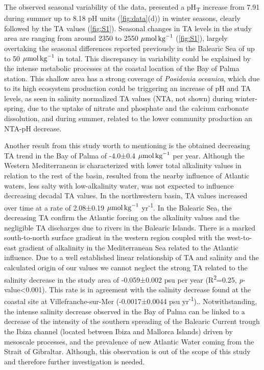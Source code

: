 The observed seasonal variability of the data, presented a
pH\textsubscript{T} increase from 7.91 during summer up to 8.18 pH units
(\cref{fig:data}(d)) in winter seasons, clearly followed by the TA values
(\cref{fig:S1}). Seasonal changes in TA levels in the study area are ranging
from around 2350 to 2550 ${\mu \textrm{mol\,kg}^{-1}}$ (\cref{fig:S1}), largely
overtaking the seasonal differences reported previously in the Balearic Sea of
up to 50 ${\mu \textrm{mol\,kg}^{-1}}$ in
total\cite{cossarini2015spatiotemporal}. This discrepancy in variability could
be explained by the intense metabolic processes at the coastal location of the
Bay of Palma station. This shallow area has a strong coverage of
\emph{Posidonia oceanica}, which due to its high ecosystem
production\cite{koopmans2020high} could be triggering an increase of pH and TA
levels, as seen in salinity normalized TA values (NTA, not shown) during
winter-spring, due to the uptake of nitrate and phosphate and the calcium
carbonate dissolution\cite{barron2006organic,cossarini2015spatiotemporal}, and
during summer, related to the lower community
production\cite{champenois2012seasonal} an NTA-pH
decrease\cite{cossarini2015spatiotemporal}.

Another result from this study worth to mentioning is the obtained
decreasing TA trend in the Bay of Palma of -4.0±0.4 ${\mu
            \textrm{mol\,kg}^{-1}}$ per year. Although the Western
Mediterranean is
characterized with lower total alkalinity values in relation to the rest of the
basin, resulted from the nearby influence of Atlantic waters, less salty with
low-alkalinity water\cite{RIVARO2010236,hassoun2015modeling}, was not expected
to influence decreasing decadal TA values. In the northwestern basin, TA values
increased over time at a rate of 2.08±0.19 ${\mu \textrm{mol\,kg}^{-1}}$
yr\textsuperscript{-1}. In the Balearic Sea, the decreasing TA confirm the
Atlantic forcing on the alkalinity values and the negligible TA discharges due
to rivers in the Balearic Islands. There is a marked south-to-north surface
gradient in the western region coupled with the west-to-east gradient of
alkalinity in the Mediterranean Sea related to the Atlantic
influence\cite{cossarini2015spatiotemporal,Gemayel2015}. Due to a well
established linear relationship of TA and
salinity\cite{schneider2007alkalinity} and the calculated origin of our
values\cite{Gemayel2015} we cannot neglect the strong TA related to the
salinity decrease in the study area of -0.059±0.002 psu per year
(R\textsuperscript{2}=0.25, \emph{p}-value<0.001). This rate is in agreement
with the salinity decrease found at the coastal site at Villefranche-sur-Mer
(-0.0017±0.0044 psu yr\textsuperscript{-1}).\cite{Kapsenberg2017}.
Notwithstanding, the intense salinity decrease observed in the Bay of Palma can
be linked to a decrease of the intensity of the southern spreading of the
Balearic Current trough the Ibiza channel (located between Ibiza and Mallorca
Islands) driven by mesoscale processes, and the prevalence of new Atlantic
Water coming from the Strait of Gibraltar\cite{millot1999circulation}.
Although, this observation is out of the scope of this study and therefore
further investigation is needed.

